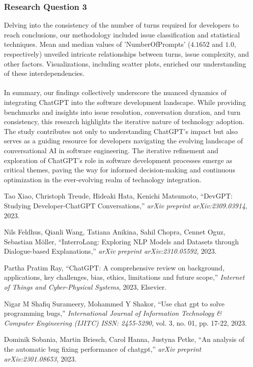 \documentclass[journal]{IEEEtran}
\begin{document}
\subsubsection{Research Question 3} Delving into the consistency of the number of turns required for developers to reach conclusions, our methodology included issue classification and statistical techniques. Mean and median values of 'NumberOfPrompts' ($4.1652$ and $1.0$, respectively) unveiled intricate relationships between turns, issue complexity, and other factors. Visualizations, including scatter plots, enriched our understanding of these interdependencies.
\\ \\
In summary, our findings collectively underscore the nuanced dynamics of integrating ChatGPT into the software development landscape. While providing benchmarks and insights into issue resolution, conversation duration, and turn consistency, this research highlights the iterative nature of technology adoption. The study contributes not only to understanding ChatGPT's impact but also serves as a guiding resource for developers navigating the evolving landscape of conversational AI in software engineering. The iterative refinement and exploration of ChatGPT's role in software development processes emerge as critical themes, paving the way for informed decision-making and continuous optimization in the ever-evolving realm of technology integration.

\begin{thebibliography}{99}

  Tao Xiao, Christoph Treude, Hideaki Hata, Kenichi Matsumoto,
  ``DevGPT: Studying Developer-ChatGPT Conversations,''
  \textit{arXiv preprint arXiv:2309.03914},
  2023.

  Nils Feldhus, Qianli Wang, Tatiana Anikina, Sahil Chopra, Cennet Oguz, Sebastian M{\"o}ller,
  ``InterroLang: Exploring NLP Models and Datasets through Dialogue-based Explanations,''
  \textit{arXiv preprint arXiv:2310.05592},
  2023.

  Partha Pratim Ray,
  ``ChatGPT: A comprehensive review on background, applications, key challenges, bias, ethics, limitations and future scope,''
  \textit{Internet of Things and Cyber-Physical Systems},
  2023,
  Elsevier.

  Nigar M Shafiq Surameery, Mohammed Y Shakor,
  ``Use chat gpt to solve programming bugs,''
  \textit{International Journal of Information Technology \& Computer Engineering (IJITC) ISSN: 2455-5290},
  vol. 3, no. 01, pp. 17-22,
  2023.

  Dominik Sobania, Martin Briesch, Carol Hanna, Justyna Petke,
  ``An analysis of the automatic bug fixing performance of chatgpt,''
  \textit{arXiv preprint arXiv:2301.08653},
  2023.

\end{thebibliography}
\end{document}
